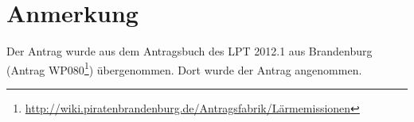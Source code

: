 \section{Anmerkung}

Der Antrag wurde aus dem Antragsbuch des LPT 2012.1 aus Brandenburg (Antrag WP080\footnote{\url{http://wiki.piratenbrandenburg.de/Antragsfabrik/Lärmemissionen}}) übergenommen. Dort wurde der Antrag angenommen.
